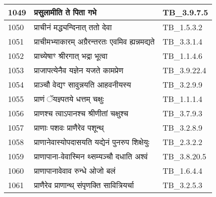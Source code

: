 \documentclass[17pt]{extarticle}
\begin{document}
\begin{longtable}{||p{0.4in}||p{4.9in}||p{0.9in}||}
    1049 & प्रसुलामीति ते पिता गभे & TB\_3.9.7.5       \\
    
    \hline
        
    1050 & प्राचीनं मद्ध्यन्दिनात् ततो देवा & TB\_1.5.3.2       \\
    
    \hline
        
    1051 & प्राचीमभ्याकारम् अग्रैरन्तरतः एवमिव ह्यन्नमद्यते & TB\_3.3.1.4       \\
    
    \hline
        
    1052 & प्राच्येषाꣳ श्रीरगात् भद्रा भूत्वा & TB\_1.1.4.6       \\
    
    \hline
        
    1053 & प्राजापत्येनैव यज्ञेन यजते कामप्रेण & TB\_3.9.22.4       \\
    
    \hline
        
    1054 & प्राञ्चौ वेद्यꣳ सावुन्नयति आहवनीयस्य & TB\_3.2.9.9       \\
    
    \hline
        
    1055 & प्राणं ॅयज्ञ्पतये धत्तम् चक्षुः & TB\_1.1.1.4       \\
    
    \hline
        
    1056 & प्राणश्च त्वाऽपानश्च श्रीणीतां चक्षुश्च & TB\_3.7.9.3       \\
    
    \hline
        
    1057 & प्राणाः पशवः प्राणैरेव पशून्थ् & TB\_3.2.8.9       \\
    
    \hline
        
    1058 & प्राणानेवास्योपदासयति यद्येनं पुनरुप शिक्षेयुः & TB\_2.3.2.2       \\
    
    \hline
        
    1059 & प्राणापाना{-}वेवास्मिन थ्सम्यञ्चौ दधाति अश्वं & TB\_3.8.20.5       \\
    
    \hline
        
    1060 & प्राणापानावेवाव रुन्धे ओजो बलं & TB\_1.6.4.4       \\
    
    \hline
        
    1061 & प्राणैरेव प्राणान्थ् संपृणक्ति सावित्रियर्चा & TB\_3.2.5.3       \\
    

\end{longtable}
\end{document}
